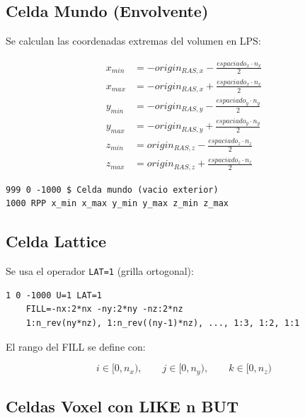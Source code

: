 \documentclass[12pt,a4paper]{article}
\begin{document}
\subsection{Celda Mundo (Envolvente)}

Se calculan las coordenadas extremas del volumen en LPS:

$$
\begin{aligned}
x_{min} &= -origin_{RAS,x} - \frac{espaciado_x \cdot n_x}{2} \\
x_{max} &= -origin_{RAS,x} + \frac{espaciado_x \cdot n_x}{2} \\
y_{min} &= -origin_{RAS,y} - \frac{espaciado_y \cdot n_y}{2} \\
y_{max} &= -origin_{RAS,y} + \frac{espaciado_y \cdot n_y}{2} \\
z_{min} &= origin_{RAS,z} - \frac{espaciado_z \cdot n_z}{2} \\
z_{max} &= origin_{RAS,z} + \frac{espaciado_z \cdot n_z}{2}
\end{aligned}
$$


\begin{lstlisting}
999 0 -1000 $ Celda mundo (vacio exterior)
1000 RPP x_min x_max y_min y_max z_min z_max
\end{lstlisting}

\subsection{Celda Lattice}

Se usa el operador \texttt{LAT=1} (grilla ortogonal):

\begin{lstlisting}
1 0 -1000 U=1 LAT=1
    FILL=-nx:2*nx -ny:2*ny -nz:2*nz
    1:n_rev(ny*nz), 1:n_rev((ny-1)*nz), ..., 1:3, 1:2, 1:1
\end{lstlisting}

El rango del FILL se define con:

$$
i \in [0, n_x),\qquad j \in [0, n_y),\qquad k \in [0, n_z)
$$


\subsection{Celdas Voxel con LIKE n BUT}
\end{document}
